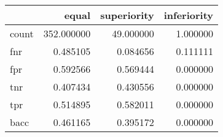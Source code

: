 \begin{tabular}{lrrr}
\toprule
{} &       equal &  superiority &  inferiority \\
\midrule
count &  352.000000 &    49.000000 &     1.000000 \\
fnr   &    0.485105 &     0.084656 &     0.111111 \\
fpr   &    0.592566 &     0.569444 &     0.000000 \\
tnr   &    0.407434 &     0.430556 &     0.000000 \\
tpr   &    0.514895 &     0.582011 &     0.000000 \\
bacc  &    0.461165 &     0.395172 &     0.000000 \\
\bottomrule
\end{tabular}
